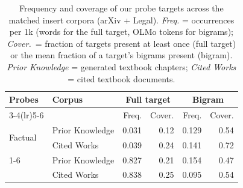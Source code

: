 \begin{table}[h]
\centering
\small
\setlength{\tabcolsep}{4pt}
\renewcommand{\arraystretch}{0.9}
\caption{Frequency and coverage of our probe targets across the matched insert corpora (arXiv + Legal). \textit{Freq.} = occurrences per 1k (words for the full target, OLMo tokens for bigrams); \textit{Cover.}\ = fraction of targets present at least once (full target) or the mean fraction of a target's bigrams present (bigram). \textit{Prior Knowledge} = generated textbook chapters; \textit{Cited Works} = cited textbook documents.}
\label{tab:target-occurrence-insert}
\begin{tabular}{llrrrr}
\toprule
Probes & Corpus & \multicolumn{2}{c}{Full target} & \multicolumn{2}{c}{Bigram} \\
\cmidrule(lr){3-4}\cmidrule(lr){5-6}
 & & Freq. & Cover. & Freq. & Cover. \\
\midrule
\multirow{2}{*}{Factual} & Prior Knowledge & 0.031 & 0.12 & 0.129 & 0.54 \\
 & Cited Works & 0.039 & 0.24 & 0.141 & 0.72 \\
\cmidrule(lr){1-6}
\multirow{2}{*}{Inference} & Prior Knowledge & 0.827 & 0.21 & 0.154 & 0.47 \\
 & Cited Works & 0.838 & 0.25 & 0.095 & 0.54 \\
\bottomrule
\end{tabular}
\end{table}
